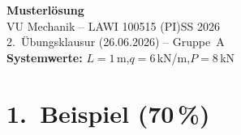 \documentclass[a4paper,11pt]{article}
\begin{document}

\begin{center}
  {\Large\bfseries Musterlösung}\\[4pt]
  {\large VU Mechanik -- LAWI 100515 (PI)\quad SS 2026}\\[2pt]
  {\normalsize 2.~Übungsklausur (26.06.2026) -- Gruppe~A}\\[2pt]
  {\normalsize \textbf{Systemwerte:} $L = 1$\,m,\quad $q = 6$\,kN/m,\quad $P = 8$\,kN}
\end{center}

\section*{1.~Beispiel \hfill (70\,\%)}
\end{document}
